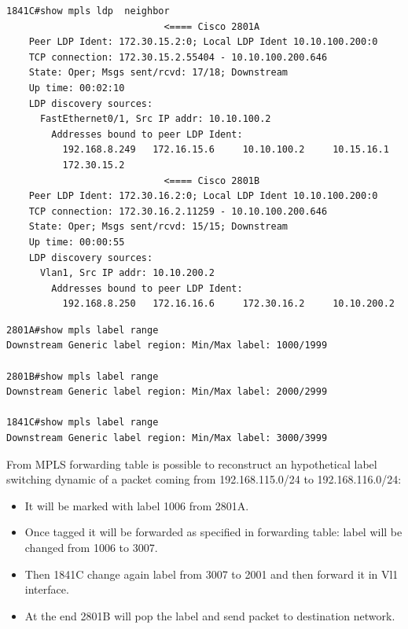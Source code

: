\documentclass{llncs}
\begin{document}
\lstset{language=sh, caption=MPLS Neighborhood on router Cisco 1841C, basicstyle=\ttfamily\scriptsize , breaklines=true}
\begin{lstlisting}
1841C#show mpls ldp  neighbor 
							<==== Cisco 2801A
    Peer LDP Ident: 172.30.15.2:0; Local LDP Ident 10.10.100.200:0 
	TCP connection: 172.30.15.2.55404 - 10.10.100.200.646
	State: Oper; Msgs sent/rcvd: 17/18; Downstream
	Up time: 00:02:10
	LDP discovery sources:
	  FastEthernet0/1, Src IP addr: 10.10.100.2
        Addresses bound to peer LDP Ident:
          192.168.8.249   172.16.15.6     10.10.100.2     10.15.16.1      
          172.30.15.2 
							<==== Cisco 2801B
    Peer LDP Ident: 172.30.16.2:0; Local LDP Ident 10.10.100.200:0 
	TCP connection: 172.30.16.2.11259 - 10.10.100.200.646
	State: Oper; Msgs sent/rcvd: 15/15; Downstream
	Up time: 00:00:55
	LDP discovery sources:
	  Vlan1, Src IP addr: 10.10.200.2
        Addresses bound to peer LDP Ident:
          192.168.8.250   172.16.16.6     172.30.16.2     10.10.200.2     
\end{lstlisting}

\lstset{language=sh, caption=MPLS Label configuration in all LSR, basicstyle=\ttfamily\scriptsize , breaklines=true}
\begin{lstlisting}
2801A#show mpls label range 
Downstream Generic label region: Min/Max label: 1000/1999

2801B#show mpls label range 
Downstream Generic label region: Min/Max label: 2000/2999

1841C#show mpls label range 
Downstream Generic label region: Min/Max label: 3000/3999
\end{lstlisting}

From MPLS forwarding table is possible to reconstruct an hypothetical label switching dynamic of a packet coming from 192.168.115.0/24 to 192.168.116.0/24:
\begin{itemize}
\item It will be marked with label 1006 from 2801A.
\item Once tagged it will be forwarded as specified in forwarding table: label will be changed from 1006 to 3007.
\item Then 1841C change again label from 3007 to 2001 and then forward it in Vl1 interface.
\item At the end 2801B will pop the label and send packet to destination network.
\end{itemize}
\end{document}
